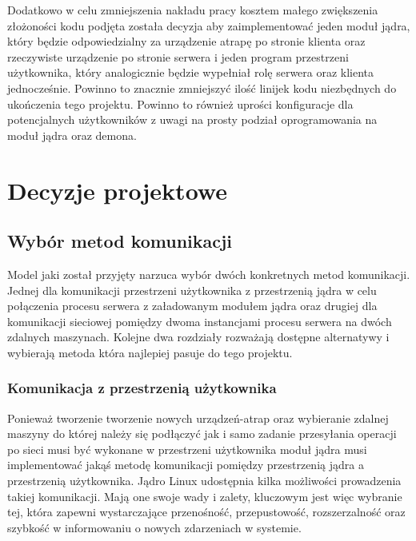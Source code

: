 \documentclass[10pt]{scrartcl}
\begin{document}
Dodatkowo w celu zmniejszenia nakładu pracy kosztem małego zwiększenia złożoności kodu podjęta została decyzja aby zaimplementować jeden moduł jądra, który będzie odpowiedzialny za urządzenie atrapę po stronie klienta oraz rzeczywiste urządzenie po stronie serwera i jeden program przestrzeni użytkownika, który analogicznie będzie wypełniał rolę serwera oraz klienta jednocześnie. Powinno to znacznie zmniejszyć ilość linijek kodu niezbędnych do ukończenia tego projektu. Powinno to również uprości konfiguracje dla potencjalnych użytkowników z uwagi na prosty podział oprogramowania na moduł jądra oraz demona.

\section{Decyzje projektowe}

\subsection{Wybór metod komunikacji}

Model jaki został przyjęty narzuca wybór dwóch konkretnych metod komunikacji. Jednej dla komunikacji przestrzeni użytkownika z przestrzenią jądra w celu połączenia procesu serwera z załadowanym modułem jądra oraz drugiej dla komunikacji sieciowej pomiędzy dwoma instancjami procesu serwera na dwóch zdalnych maszynach. Kolejne dwa rozdziały rozważają dostępne alternatywy i wybierają metoda która najlepiej pasuje do tego projektu.

\subsubsection{Komunikacja z przestrzenią użytkownika}
\label{userlandcomm}

Ponieważ tworzenie tworzenie nowych urządzeń-atrap oraz wybieranie zdalnej maszyny do której należy się podłączyć jak i samo zadanie przesyłania operacji po sieci musi być wykonane w przestrzeni użytkownika moduł jądra musi implementować jakąś metodę komunikacji pomiędzy przestrzenią jądra a przestrzenią użytkownika. Jądro Linux udostępnia kilka możliwości prowadzenia takiej komunikacji. Mają one swoje wady i zalety, kluczowym jest więc wybranie tej, która zapewni wystarczające przenośność, przepustowość, rozszerzalność oraz szybkość w informowaniu o nowych zdarzeniach w systemie.
\end{document}

